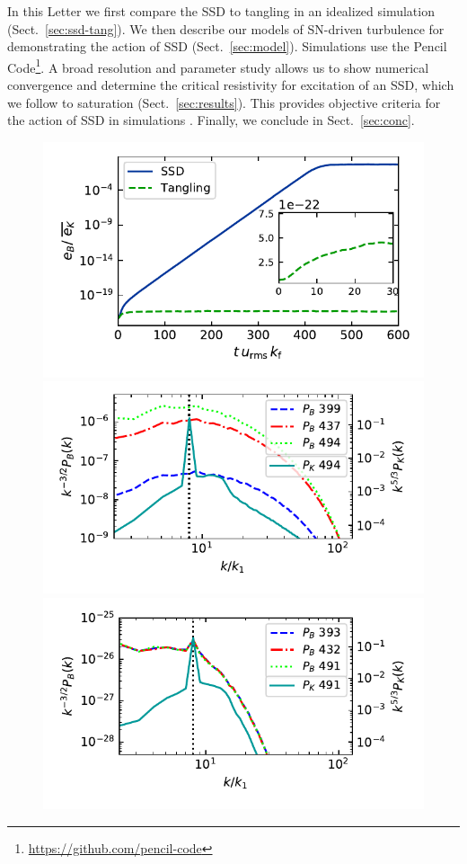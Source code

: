 \documentclass[preprint2]{aastex63}
\begin{document}
 In this { L}etter we {first} compare the SSD to tangling in an idealized
 simulation (Sect.~\ref{sec:ssd-tang}){.
 We then describe our models of SN-driven turbulence for demonstrating the
 action of SSD (Sect.~\ref{sec:model}).} 
 {Simulations} use the {\sc Pencil Code}\footnote{
 \href{https://github.com/pencil-code}{https://github.com/pencil-code}}.
 A broad resolution and parameter study allows us to {show numerical}
 {convergence and} {determine} the critical resistivity for excitation
 of an SSD, {which we follow} to saturation (Sect.~\ref{sec:results}).
 This provides objective criteria {for the action} of SSD in simulations
 \citep[such as][]{Gent:2013b,GE20,SBADMN19}.
 Finally, we conclude in Sect.~\ref{sec:conc}.
\begin{figure}
  \includegraphics[trim=0.00cm 0.3cm 0.0cm 0.0cm, clip=true,width=0.91\columnwidth]{figs/ssd-tang-brms.pdf}
  \includegraphics[trim=0.25cm 0.3cm 0.5cm 0.1cm, clip=true,width=1.0\columnwidth]{figs/ssdBpower.pdf}
  \includegraphics[trim=0.35cm 0.6cm 0.5cm 0.3cm, clip=true,width=1.0\columnwidth]{figs/tanglingBpower.pdf}

\end{figure}
\end{document}
